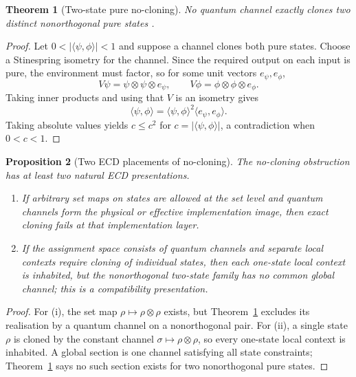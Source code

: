 \documentclass[11pt]{article}
\theoremstyle{plain}
\newtheorem{theorem}{Theorem}[section]
\newtheorem{proposition}[theorem]{Proposition}
\theoremstyle{definition}
\theoremstyle{remark}
\begin{document}
\begin{theorem}[Two-state pure no-cloning]
\label{thm:pure-no-cloning-placement}
No quantum channel exactly clones two distinct nonorthogonal pure states \cite{wootterszurek}.
\end{theorem}

\begin{proof}
Let $0<|\langle\psi,\phi\rangle|<1$ and suppose a channel clones both pure
states. Choose a Stinespring isometry for the channel. Since the required output
on each input is pure, the environment must factor, so for some unit vectors
$e_\psi,e_\phi$,
\[
V\psi=\psi\otimes\psi\otimes e_\psi,
\qquad
V\phi=\phi\otimes\phi\otimes e_\phi.
\]
Taking inner products and using that $V$ is an isometry gives
\[
\langle\psi,
\phi\rangle
=\langle\psi,
\phi\rangle^2\langle e_\psi,e_\phi\rangle.
\]
Taking absolute values yields $c\le c^2$ for $c=|\langle\psi,\phi\rangle|$, a
contradiction when $0<c<1$.
\end{proof}

\begin{proposition}[Two ECD placements of no-cloning]
\label{prop:no-cloning-placements}
The no-cloning obstruction has at least two natural ECD presentations.
\begin{enumerate}[label=(\roman*)]
\item If arbitrary set maps on states are allowed at the set level and quantum
channels form the physical or effective implementation image, then exact cloning
fails at that implementation layer.
\item If the assignment space consists of quantum channels and separate local
contexts require cloning of individual states, then each one-state local context
is inhabited, but the nonorthogonal two-state family has no common global channel;
this is a compatibility presentation.
\end{enumerate}
\end{proposition}

\begin{proof}
For (i), the set map $\rho\mapsto\rho\otimes\rho$ exists, but
Theorem~\ref{thm:pure-no-cloning-placement} excludes its realisation by a quantum
channel on a nonorthogonal pair. For (ii), a single state $\rho$ is cloned by the
constant channel $\sigma\mapsto\rho\otimes\rho$, so every one-state local context
is inhabited. A global section is one channel satisfying all state constraints;
Theorem~\ref{thm:pure-no-cloning-placement} says no such section exists for two
nonorthogonal pure states.
\end{proof}
\end{document}
